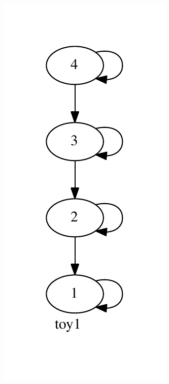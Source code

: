 \documentclass{article}
\begin{document}
\begin{figure}[h]
  \centering

  \begin{subfigure}{0.25\textwidth}
    \includegraphics[width=\textwidth]{toy1}

\end{subfigure}
\end{figure}
\end{document}
